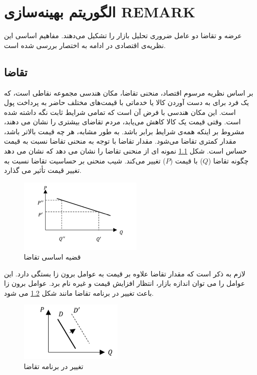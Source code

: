 \chapter{الگوریتم بهینه‌سازی REMARK}
عرضه و تقاضا دو عامل ضروری تحلیل بازار را تشکیل می‌دهند. مفاهیم اساسی این نظریه‌ی اقتصادی در ادامه به اختصار بررسی شده است.

\section{تقاضا}
بر اساس نظریه مرسوم اقتصاد، منحنی تقاضا، مکان هندسی مجموعه نقاطی است، که یک فرد برای به دست آوردن کالا یا خدماتی با قیمت‌های مختلف حاضر به پرداخت پول است. این مکان هندسی با فرض آن است که تمامی شرایط  ثابت نگه داشته شده است. 
 وقتی قیمت یک کالا کاهش می‌یابد، مردم تقاضای بیشتری را نشان می دهند، مشروط بر اینکه همه‌ی شرایط برابر باشد. به طور مشابه، هر چه قیمت بالاتر باشد، مقدار کمتری تقاضا می‌شود. مقدار تقاضا با توجه به منحنی تقاضا نسبت به قیمت حساس است. شکل \ref{fig:demand} نمونه ای از منحنی تقاضا را نشان می دهد که نشان می دهد چگونه تقاضا ($Q$) با قیمت ($P$) تغییر می‌کند. شیب منحنی بر حساسیت تقاضا نسبت به تغییر قیمت تأثیر می گذارد.
 
 \begin{figure}[H]
 	\includegraphics[width=6cm]{../Figure/introduction/demand.png}
 	\centering
 	\caption{قضیه اساسی تقاضا
 		\cite{Nobahari2022}}
 	\label{fig:demand}
 \end{figure}

لازم به ذکر است که مقدار تقاضا علاوه بر قیمت به عوامل برون زا بستگی دارد. این عوامل را می توان اندازه بازار، انتظار افزایش قیمت و غیره نام برد. عوامل برون زا باعث تغییر در برنامه تقاضا مانند شکل \ref{fig:demand_shift} می شود.

 \begin{figure}[H]
	\includegraphics[width=5cm]{../Figure/introduction/demand_shift.png}
	\centering
	\caption{تغییر در برنامه تقاضا}
	\label{fig:demand_shift}
\end{figure}

